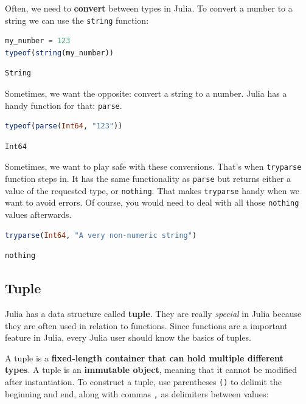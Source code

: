 \documentclass[
  notoc %
]{tufte-book}
\newcommand{\passthrough}[1]{#1}
\begin{document}
Often, we need to \textbf{convert} between types in Julia. To convert a
number to a string we can use the \passthrough{\lstinline!string!}
function:

\begin{lstlisting}[language=Julia]
my_number = 123
typeof(string(my_number))
\end{lstlisting}

\begin{lstlisting}[language=Output]
String
\end{lstlisting}

Sometimes, we want the opposite: convert a string to a number. Julia has
a handy function for that: \passthrough{\lstinline!parse!}.

\begin{lstlisting}[language=Julia]
typeof(parse(Int64, "123"))
\end{lstlisting}

\begin{lstlisting}[language=Output]
Int64
\end{lstlisting}

Sometimes, we want to play safe with these conversions. That's when
\passthrough{\lstinline!tryparse!} function steps in. It has the same
functionality as \passthrough{\lstinline!parse!} but returns either a
value of the requested type, or \passthrough{\lstinline!nothing!}. That
makes \passthrough{\lstinline!tryparse!} handy when we want to avoid
errors. Of course, you would need to deal with all those
\passthrough{\lstinline!nothing!} values afterwards.

\begin{lstlisting}[language=Julia]
tryparse(Int64, "A very non-numeric string")
\end{lstlisting}

\begin{lstlisting}[language=Output]
nothing
\end{lstlisting}

\hypertarget{sec:tuple}{%
\subsection{Tuple}\label{sec:tuple}}

Julia has a data structure called \textbf{tuple}. They are really
\emph{special} in Julia because they are often used in relation to
functions. Since functions are a important feature in Julia, every Julia
user should know the basics of tuples.

A tuple is a \textbf{fixed-length container that can hold multiple
different types}. A tuple is an \textbf{immutable object}, meaning that
it cannot be modified after instantiation. To construct a tuple, use
parentheses \passthrough{\lstinline!()!} to delimit the beginning and
end, along with commas \passthrough{\lstinline!,!} as delimiters between
values:
\end{document}
